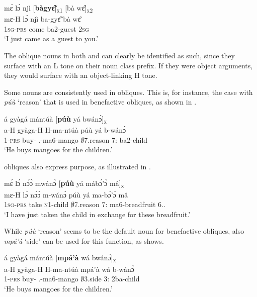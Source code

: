 \ea \label{notone2}
  \glll mɛ́ lɔ́ njì [{\bfseries bàgyɛ̃̂}]\textsubscript{\textsc{x}1} [bà wɛ̂]\textsubscript{\textsc{x}2} \\
       mɛ-H lɔ́ njì {\db}ba-gyɛ̃̂ {\db}bà wɛ̂ \\
       1\textsc{sg}-\textsc{prs} {\RETRO} come {\db}ba2-guest {\db}{\AP} 2\textsc{sg}  \\
    \trans `I just came as a guest to you.'
\z

\noindent The oblique nouns in both  and  can clearly be identified as such, since they surface with an L tone on their noun class prefix. If they were object arguments, they would surface with an object-linking H tone.




Some nouns are consistently used in obliques. This is, for instance, the case with {\itshape púù} `reason' that is used in benefactive obliques, as shown in .

\ea \label{BEN1}
  \glll á gyàgá mántúà [{\bfseries púù} yá bwánɔ̀]\textsubscript{\textsc{x}}\\
        a-H gyàga-H H-ma-ntúà {\db}púù yá b-wánɔ̀\\
        1-\textsc{prs} buy-{\R} {\OBJ}.{\LINK}-ma6-mango {\db}$\emptyset$7.reason 7:{\ATT} ba2-child\\
    \trans `He buys mangoes for the children.'
\z

 obliques also express purpose, as illustrated in .

\ea \label{BEN2}
  \glll mɛ́ lɔ́ nɔ́ɔ̀ mwánɔ̀ [{\bfseries púù} yá mábɔ́'ɔ̀ mâ]\textsubscript{\textsc{x}} \\
        mɛ-H lɔ́ nɔ́ɔ̀ m-wánɔ̀ {\db}púù yá ma-bɔ́'ɔ̀ mâ \\
        1\textsc{sg}-\textsc{prs} {\RETRO} take \textsc{n}1-child {\db}$\emptyset$7.reason 7:{\ATT} ma6-breadfruit 6.{\DEM}.{\PROX}\\
    \trans `I have just taken the child in exchange for these breadfruit.'
\z

While {\itshape púù} `reason' seems to be the default noun for benefactive obliques, also {\itshape mpá'à} `side' can be used for this function, as  shows.

\ea \label{BEN3}
  \glll á gyàgá mántúà [{\bfseries mpá'à} wá bwánɔ̀]\textsubscript{\textsc{x}}\\
        a-H gyàga-H H-ma-ntúà {\db}mpá'à wá b-wánɔ̀\\
        1-\textsc{prs} buy-{\R} {\OBJ}.{\LINK}-ma6-mango {\db}$\emptyset$3.side 3:{\ATT} 2ba-child\\
    \trans `He buys mangoes for the children.'
\z


